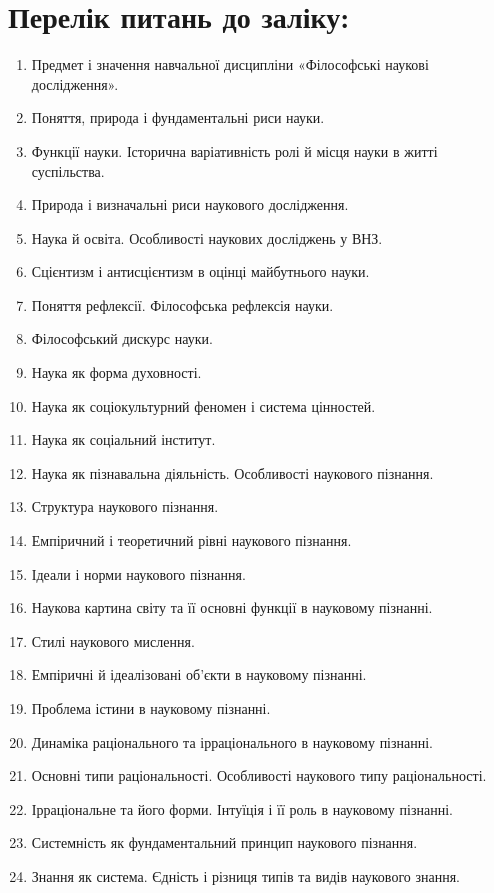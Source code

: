 \section{Перелік питань до заліку:}

\begin{enumerate}
\item Предмет і значення навчальної дисципліни «Філософські наукові дослідження».
\item Поняття, природа і фундаментальні риси науки.
\item Функції науки. Історична варіативність ролі й місця науки в житті суспільства.
\item Природа і визначальні риси наукового дослідження.
\item Наука й освіта. Особливості наукових досліджень у ВНЗ.
\item Сцієнтизм і антисцієнтизм в оцінці майбутнього науки.
\item Поняття рефлексії. Філософська рефлексія науки.
\item Філософський дискурс науки.
\item Наука як форма духовності.
\item Наука як соціокультурний феномен і система цінностей.
\item Наука як соціальний інститут.
\item Наука як пізнавальна діяльність. Особливості наукового пізнання.
\item Структура наукового пізнання.
\item Емпіричний і теоретичний рівні наукового пізнання.
\item Ідеали і норми наукового пізнання.
\item Наукова картина світу та її основні функції в науковому пізнанні.
\item Стилі наукового мислення.
\item Емпіричні й ідеалізовані об’єкти в науковому пізнанні.
\item Проблема істини в науковому пізнанні.
\item Динаміка раціонального та ірраціонального в науковому пізнанні.
\item Основні типи раціональності. Особливості наукового типу раціональності.
\item Ірраціональне та його форми. Інтуїція і її роль в науковому пізнанні.
\item Системність як фундаментальний принцип наукового пізнання.
\item Знання як система. Єдність і різниця типів та видів наукового знання.

\end{enumerate}
